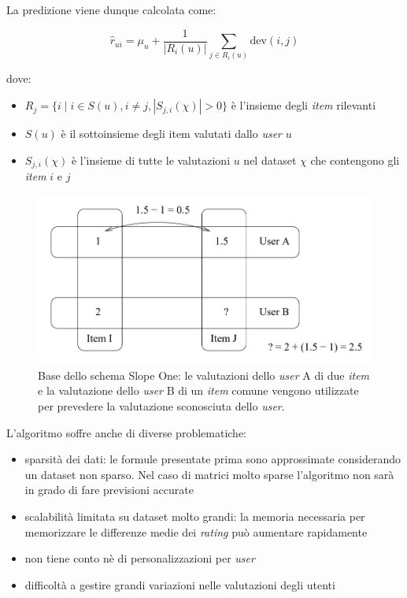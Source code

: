 La predizione viene dunque calcolata come:

\[
    \hat{r}_{ui} = \mu_u + \frac{1}{|R_i(u)|} \sum\limits_{j \in R_i(u)} \text{dev}(i, j)
\]

dove:

\begin{itemize}
    \item $R_j = \{ i \mid i \in S(u), i \neq j, |S_{j,i}(\chi)| > 0 \}$ è l'insieme degli \textit{item} rilevanti
    \item $S(u)$ è il sottoinsieme degli item valutati dallo \textit{user} $u$
    \item $S_{j,i}(\chi)$ è l'insieme di tutte le valutazioni $u$ nel dataset $\chi$ che contengono gli \textit{item} $i$ e $j$
\end{itemize}

\begin{figure}[H]
    \centering
    \includegraphics[keepaspectratio]{figures/algorithms/slope_one.PNG}
    \caption{Base dello schema Slope One: le valutazioni dello \textit{user} A di due \textit{item} e la valutazione  dello \textit{user} B di un \textit{item} comune vengono utilizzate per prevedere la valutazione sconosciuta dello \textit{user}.}
    \label{fig:slopeone}
\end{figure}

L'algoritmo soffre anche di diverse problematiche:
\begin{itemize}
    \item sparsità dei dati: le formule presentate prima sono approssimate considerando un dataset non sparso. Nel caso di matrici molto sparse l'algoritmo non sarà in grado di fare previsioni accurate
    \item scalabilità limitata su dataset molto grandi: la memoria necessaria per memorizzare le differenze medie dei \textit{rating} può aumentare rapidamente
    \item non tiene conto nè di personalizzazioni per \textit{user} 
    \item difficoltà a gestire grandi variazioni nelle valutazioni degli utenti
\end{itemize}


